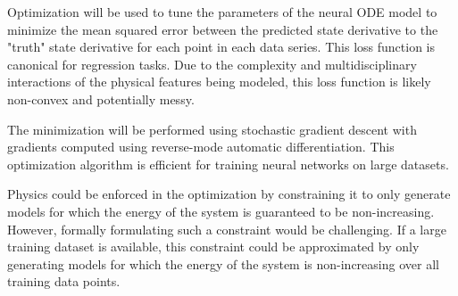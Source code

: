 \documentclass[11pt]{article}
\begin{document}
Optimization will be used to tune the parameters of the neural ODE model to minimize the mean squared error between the predicted state derivative to the "truth" state derivative for each point in each data series. This loss function is canonical for regression tasks. Due to the complexity and multidisciplinary interactions of the physical features being modeled, this loss function is likely non-convex and potentially messy.

The minimization will be performed using stochastic gradient descent with gradients computed using reverse-mode automatic differentiation. This optimization algorithm is efficient for training neural networks on large datasets.

Physics could be enforced in the optimization by constraining it to only generate models for which the energy of the system is guaranteed to be non-increasing. However, formally formulating such a constraint would be challenging. If a large training dataset is available, this constraint could be approximated by only generating models for which the energy of the system is non-increasing over all training data points.
\end{document}
